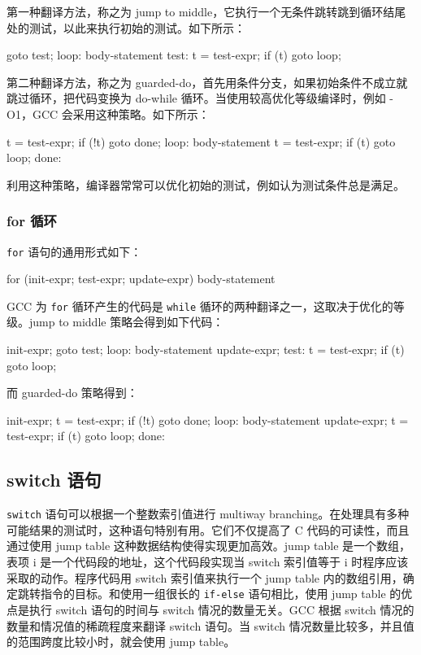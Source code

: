 第一种翻译方法，称之为 jump to middle，它执行一个无条件跳转跳到循环结尾处的测试，以此来执行初始的测试。如下所示：
\begin{cppcode}
  goto test;
loop:
  body-statement
test:
  t = test-expr;
  if (t)
    goto loop;
\end{cppcode}

第二种翻译方法，称之为 guarded-do，首先用条件分支，如果初始条件不成立就跳过循环，把代码变换为 do-while 循环。当使用较高优化等级编译时，例如 -O1，GCC 会采用这种策略。如下所示：
\begin{cppcode}
t = test-expr;
if (!t)
  goto done;
loop:
  body-statement
  t = test-expr;
  if (t)
    goto loop;
done:
\end{cppcode}
利用这种策略，编译器常常可以优化初始的测试，例如认为测试条件总是满足。

\subsubsection{for 循环}

\verb|for| 语句的通用形式如下：
\begin{cppcode}
for (init-expr; test-expr; update-expr)
  body-statement
\end{cppcode}

GCC 为 \verb|for| 循环产生的代码是 \verb|while| 循环的两种翻译之一，这取决于优化的等级。jump to middle 策略会得到如下代码：
\begin{cppcode}
  init-expr;
  goto test;
loop:
  body-statement
  update-expr;
test:
  t = test-expr;
  if (t)
    goto loop;
\end{cppcode}
而 guarded-do 策略得到：
\begin{cppcode}
  init-expr;
  t = test-expr;
  if (!t)
    goto done;
loop:
  body-statement
  update-expr;
  t = test-expr;
  if (t)
    goto loop;
done:
\end{cppcode}

\subsection{switch 语句}

\verb|switch| 语句可以根据一个整数索引值进行 multiway branching。在处理具有多种可能结果的测试时，这种语句特别有用。它们不仅提高了 C 代码的可读性，而且通过使用 jump table 这种数据结构使得实现更加高效。jump table 是一个数组，表项 i 是一个代码段的地址，这个代码段实现当 switch 索引值等于 i 时程序应该采取的动作。程序代码用 switch 索引值来执行一个 jump table 内的数组引用，确定跳转指令的目标。和使用一组很长的 \verb|if-else| 语句相比，使用 jump table 的优点是执行 switch 语句的时间与 switch 情况的数量无关。GCC 根据 switch 情况的数量和情况值的稀疏程度来翻译 switch 语句。当 switch 情况数量比较多，并且值的范围跨度比较小时，就会使用 jump table。

